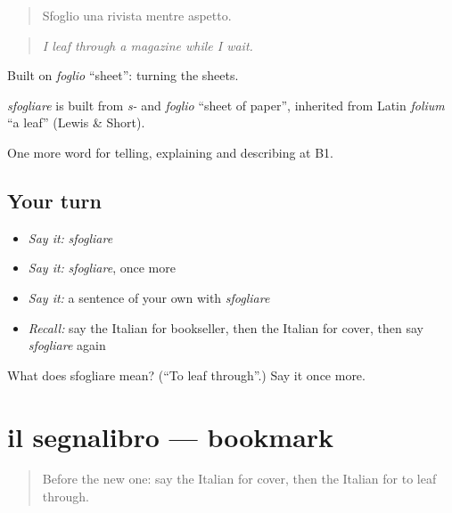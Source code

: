 \begin{quote}
Sfoglio una rivista mentre aspetto.
\end{quote}

\begin{quote}
\emph{I leaf through a magazine while I wait.}
\end{quote}

Built on \emph{foglio} \textquotedblleft{}sheet\textquotedblright{}: turning the sheets.

\begin{cousinweb}
\emph{sfogliare} is built from \emph{s-} and \emph{foglio} \textquotedblleft{}sheet of paper\textquotedblright{}, inherited from Latin \emph{folium} \textquotedblleft{}a leaf\textquotedblright{} (Lewis \& Short).
\end{cousinweb}

\begin{grammarlens}[title={What you've built}]
One more word for telling, explaining and describing at B1.
\end{grammarlens}

\subsection*{Your turn}
\begin{itemize}
\raggedright
  \item \emph{Say it:} \emph{sfogliare}
  \item \emph{Say it:} \emph{sfogliare}, once more
  \item \emph{Say it:} a sentence of your own with \emph{sfogliare}
  \item \emph{Recall:} say the Italian for bookseller, then the Italian for cover, then say \emph{sfogliare} again
\end{itemize}

\begin{tcolorbox}[breakable,colback=teal!4,colframe=teal!35!black,title={Before you move on}]
What does sfogliare mean? (\textquotedblleft{}To leaf through\textquotedblright{}.) Say it once more.
\end{tcolorbox}
\section[il segnalibro]{il segnalibro — bookmark}

\label{lesson:IT-C525-segnalibro}



\begin{quote}
Before the new one: say the Italian for cover, then the Italian for to leaf through.
\end{quote}

